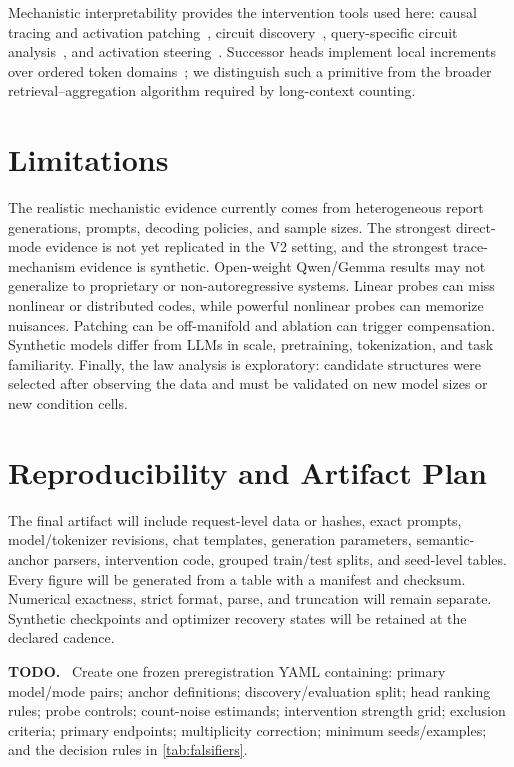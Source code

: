 \documentclass[11pt]{article}
\newenvironment{todobox}
  {\begin{center}\begin{minipage}{0.95\linewidth}\color{todored}\textbf{TODO.}~}
  {\end{minipage}\end{center}}
\begin{document}
Mechanistic interpretability provides the intervention tools used here: causal tracing and activation patching~\citep{meng2022rome}, circuit discovery~\citep{conmy2023acdc}, query-specific circuit analysis~\citep{wang2022ioi}, and activation steering~\citep{turner2023actadd}. Successor heads implement local increments over ordered token domains~\citep{gould2023successor}; we distinguish such a primitive from the broader retrieval--aggregation algorithm required by long-context counting.

\section{Limitations}

The realistic mechanistic evidence currently comes from heterogeneous report generations, prompts, decoding policies, and sample sizes. The strongest direct-mode evidence is not yet replicated in the V2 setting, and the strongest trace-mechanism evidence is synthetic. Open-weight Qwen/Gemma results may not generalize to proprietary or non-autoregressive systems. Linear probes can miss nonlinear or distributed codes, while powerful nonlinear probes can memorize nuisances. Patching can be off-manifold and ablation can trigger compensation. Synthetic models differ from LLMs in scale, pretraining, tokenization, and task familiarity. Finally, the law analysis is exploratory: candidate structures were selected after observing the data and must be validated on new model sizes or new condition cells.

\section{Reproducibility and Artifact Plan}

The final artifact will include request-level data or hashes, exact prompts, model/tokenizer revisions, chat templates, generation parameters, semantic-anchor parsers, intervention code, grouped train/test splits, and seed-level tables. Every figure will be generated from a table with a manifest and checksum. Numerical exactness, strict format, parse, and truncation will remain separate. Synthetic checkpoints and optimizer recovery states will be retained at the declared cadence.

\begin{todobox}
Create one frozen preregistration YAML containing: primary model/mode pairs; anchor definitions; discovery/evaluation split; head ranking rules; probe controls; count-noise estimands; intervention strength grid; exclusion criteria; primary endpoints; multiplicity correction; minimum seeds/examples; and the decision rules in \cref{tab:falsifiers}.
\end{todobox}
\end{document}
